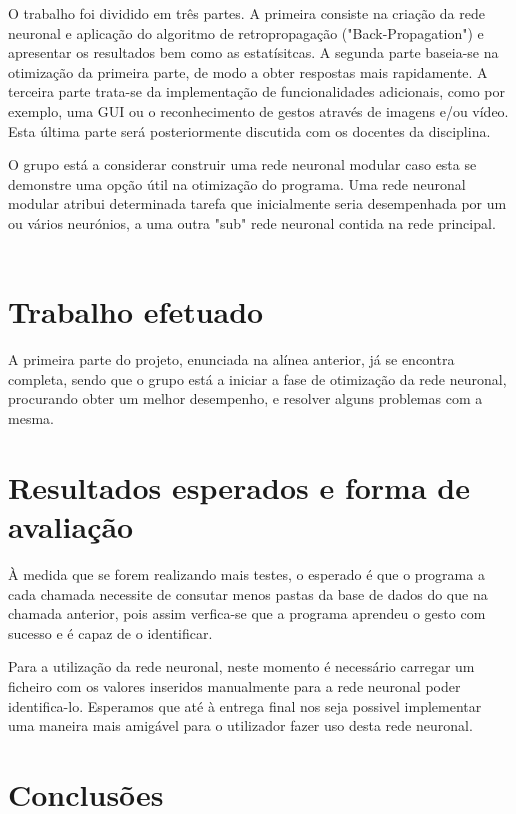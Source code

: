 \documentclass[10pt,a4paper]{article}
\begin{document}
O trabalho foi dividido em três partes. 
A primeira consiste na criação da rede neuronal e aplicação do algoritmo de retropropagação ("Back-Propagation") e apresentar os resultados bem como as estatísitcas.
A segunda parte baseia-se na otimização da primeira parte, de modo a obter respostas mais rapidamente.
A terceira parte trata-se da implementação de funcionalidades adicionais, como por exemplo, uma GUI ou o reconhecimento de gestos através de imagens e/ou vídeo. Esta última parte será posteriormente discutida com os docentes da disciplina.

O grupo está a considerar construir uma rede neuronal modular caso esta se demonstre uma opção útil na otimização do programa. Uma rede neuronal modular atribui determinada tarefa que inicialmente seria desempenhada por um ou vários neurónios, a uma outra "sub" rede neuronal contida na rede principal.
\\ \\

\section{Trabalho efetuado}
\subitem

A primeira parte do projeto, enunciada na alínea anterior, já se encontra completa, sendo que o grupo está a iniciar a fase de otimização da rede neuronal, procurando obter um melhor desempenho, e resolver alguns problemas com a mesma.

\section{Resultados esperados e forma de avaliação}
\subitem

À medida que se forem realizando mais testes, o esperado é que o programa a cada chamada necessite de consutar menos pastas da base de dados do que na chamada anterior, pois assim verfica-se que a programa aprendeu o gesto com sucesso e é capaz de o identificar.

Para a utilização da rede neuronal, neste momento é necessário carregar um ficheiro com os valores inseridos manualmente para a rede neuronal poder identifica-lo. Esperamos que até à entrega final nos seja possivel implementar uma maneira mais amigável para o utilizador fazer uso desta rede neuronal.

\section{Conclusões}
\subitem
\end{document}
